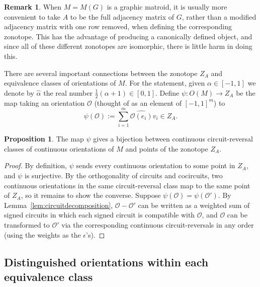 \documentclass[12pt]{amsart}
\numberwithin{equation}{section}
\theoremstyle{definition}
\newtheorem{remark}[theorem]{Remark}
\newtheorem{proposition}[theorem]{Proposition}
\begin{document}
\begin{remark} \label{rmk:graphicmatrix}
When $M=M(G)$ is a graphic matroid, it is usually more convenient to take $A$ to be the full adjacency matrix of $G$, rather than a modified adjacency matrix with one row removed, when defining the corresponding zonotope.  This has the advantage of producing a canonically defined object, and since all of these different zonotopes are isomorphic, there is little harm in doing this.
\end{remark}

\medskip

There are several important connections between the zonotope $Z_A$ and equivalence classes of orientations of $M$.
For the statement, given $\alpha \in [-1,1]$ we denote by $\hat\alpha$ the real number $\frac{1}{2}(\alpha + 1) \in [0,1]$.
Define $\psi : O(M) \to Z_A$ be the map taking an orientation ${\mathcal O}$ (thought of as an element of $[-1,1]^m$) to 
\begin{equation} \label{eq:psidef}
\psi({\mathcal O}) := \sum_{i=1}^m \widehat{{\mathcal O}(e_i)} v_i \in Z_A.
\end{equation}

\medskip

\begin{proposition} \label{prop:ctslatticepointprop}
The map $\psi$ gives a bijection between continuous circuit-reversal classes of continuous orientations of $M$ and points of the zonotope $Z_A$.
\end{proposition}

\begin{proof} By definition, $\psi$ sends every continuous orientation to some point in $Z_A$, and $\psi$ is surjective. By the orthogonality of circuits and cocircuits, two continuous orientations in the same circuit-reversal class map to the same point of $Z_A$, so it remains to show the converse. Suppose $\psi(\mathcal{O})=\psi(\mathcal{O}')$. By Lemma~\ref{lem:circuitdecomposition}, $\mathcal{O}-\mathcal{O}'$ can be written as a weighted sum of signed circuits in which each signed circuit is compatible with $\mathcal{O}$, and $\mathcal{O}$ can be transformed to $\mathcal{O}'$ via the corresponding continuous circuit-reversals in any order (using the weights as the $\epsilon$'s).
\end{proof}

\medskip


\subsection{Distinguished orientations within each equivalence class} \label{sec:DistOrient}
\end{document}
